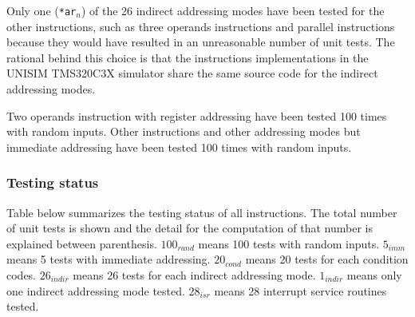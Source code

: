 Only one (\texttt{*ar$_n$}) of the 26 indirect addressing modes have been tested for the other instructions, such as three operands instructions and parallel instructions because they would have resulted in an unreasonable number of unit tests.
The rational behind this choice is that the instructions implementations in the UNISIM TMS320C3X simulator share the same source code for the indirect addressing modes.

Two operands instruction with register addressing have been tested 100 times with random inputs.
Other instructions and other addressing modes but immediate addressing have been tested 100 times with random inputs.

\subsubsection{Testing status}

\noindent Table below summarizes the testing status of all instructions. The total number of unit tests is shown and the detail for the computation of that number is explained between parenthesis. $100_{rand}$ means 100 tests with random inputs. $5_{imm}$ means 5 tests with immediate addressing. $20_{cond}$ means 20 tests for each condition codes. $26_{indir}$ means 26 tests for each indirect addressing mode. $1_{indir}$ means only one indirect addressing mode tested. $28_{isr}$ means 28 interrupt service routines tested.

\newpage

